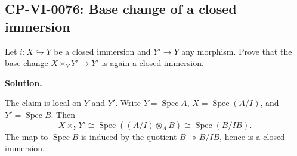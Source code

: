 
\subsection*{CP-VI-0076: Base change of a closed immersion}

Let $i:X\hookrightarrow Y$ be a closed immersion and $Y'\to Y$ any morphism. Prove that the base change $X\times_Y Y'\to Y'$ is again a closed immersion.

\medskip
\noindent\textbf{Solution.}

The claim is local on $Y$ and $Y'$. Write $Y=\operatorname{Spec}A$, $X=\operatorname{Spec}(A/I)$, and $Y'=\operatorname{Spec}B$. Then
\[
X\times_Y Y'\cong\operatorname{Spec}((A/I)\otimes_A B)
\cong\operatorname{Spec}(B/IB).
\]
The map to $\operatorname{Spec}B$ is induced by the quotient $B\twoheadrightarrow B/IB$, hence is a closed immersion.
